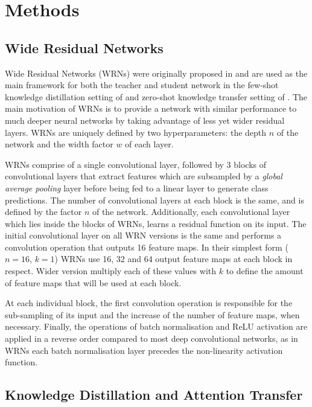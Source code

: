 \section{Methods}

\subsection{Wide Residual Networks}

Wide Residual Networks (WRNs) were originally proposed in \cite{wrn} and are used as the main framework for both the teacher and student network in the few-shot knowledge distillation setting of \cite{zagoruyko2016paying} and zero-shot knowledge transfer setting of \cite{Micaelli2019ZeroShotKT}. The main motivation of WRNs is to provide a network with similar performance to much deeper neural networks by taking advantage of less yet wider residual layers. WRNs are uniquely defined by two hyperparameters: the depth $n$ of the network and the width factor $w$ of each layer. 

WRNs comprise of a single convolutional layer, followed by 3 blocks of convolutional layers that extract features which are subsampled by a \textit{global average pooling} layer before being fed to a linear layer to generate class predictions. The number of convolutional layers at each block is the same, and is defined by the factor $n$ of the network. Additionally, each convolutional layer which lies inside the blocks of WRNs, learns a residual function\cite{resnets} on its input. The initial convolutional layer on all WRN versions is the same and performs a convolution operation that outputs 16 feature maps. In their simplest form ($n=16$, $k=1$) WRNs use 16, 32 and 64 output feature maps at each block in respect. Wider version multiply each of these values with $k$ to define the amount of feature maps that will be used at each block.  

At each individual block, the first convolution operation is responsible for the sub-sampling of its input and the increase of the number of feature maps, when necessary. Finally, the operations of batch normalisation and ReLU activation are applied in a reverse order compared to most deep convolutional networks, as in WRNs each batch normalisation layer precedes the non-linearity activation function. 


\subsection{Knowledge Distillation and Attention Transfer}\label{helpme}

